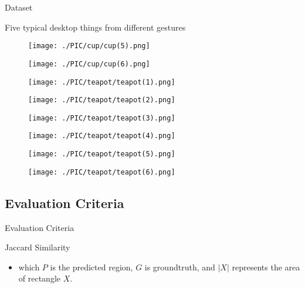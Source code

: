 \documentclass[xcolor=table,compress,blue]{beamer}
\begin{document}
\begin{frame}{Dataset}
\begin{exampleblock}{Five typical desktop things from different gestures}
\begin{figure}[htpb]
\begin{minipage}[b]{0.65in}
				\centerline{ \texttt{[image: ./PIC/cup/cup(5).png]} }
			\end{minipage}
			\begin{minipage}[b]{0.65in}
				\centerline{ \texttt{[image: ./PIC/cup/cup(6).png]} }
			\end{minipage}
			\begin{minipage}[b]{0.65in}
				\centerline{ \texttt{[image: ./PIC/teapot/teapot(1).png]} }
			\end{minipage}
			\begin{minipage}[b]{0.65in}
				\centerline{ \texttt{[image: ./PIC/teapot/teapot(2).png]} }
			\end{minipage}
			\begin{minipage}[b]{0.65in}
				\centerline{ \texttt{[image: ./PIC/teapot/teapot(3).png]} }
			\end{minipage}
			\begin{minipage}[b]{0.65in}
				\centerline{ \texttt{[image: ./PIC/teapot/teapot(4).png]} }
			\end{minipage}
			\begin{minipage}[b]{0.65in}
				\centerline{ \texttt{[image: ./PIC/teapot/teapot(5).png]} }
			\end{minipage}
			\begin{minipage}[b]{0.65in}
				\centerline{ \texttt{[image: ./PIC/teapot/teapot(6).png]} }
			\end{minipage}
			
		\end{figure}
	\end{exampleblock}
\end{frame}


\subsection{Evaluation Criteria}
\begin{frame}{Evaluation Criteria}
	\begin{exampleblock}{Jaccard Similarity}
		\begin{itemize}
			\item \large{which $P$ is the predicted region, 
				$G$ is groundtruth, and $|X|$ represents the area of rectangle $X$.}
		\end{itemize}
	\end{exampleblock}
\end{frame}
\end{document}
